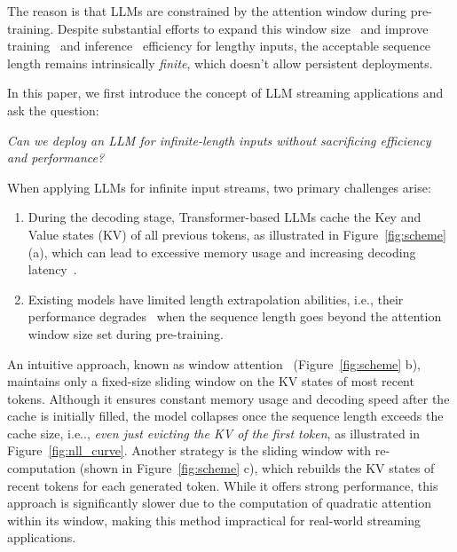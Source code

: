 \documentclass{article} \usepackage{iclr2024_conference,times}
\makeatletter
\DeclareRobustCommand\onedot{\futurelet\@let@token\@onedot}
\def\@onedot{\ifx\@let@token.\else.\null\fi\xspace}
\def\ie{i.e\onedot} \def\Ie{I.e\onedot}
\makeatother
\begin{document}
The reason is that LLMs are constrained by the attention window during pre-training. Despite substantial efforts to expand this window size~\citep{chen2023extending,kaiokendev,peng2023yarn} and improve training~\citep{dao2022flashattention,dao2023flashattention2} and inference~\citep{pope2022efficiently,xiao2023smoothquant,anagnostidis2023dynamic,wang2021spatten,zhang2023h2o} efficiency for lengthy inputs, the acceptable sequence length remains intrinsically \emph{finite}, which doesn't allow persistent deployments.

In this paper, we first introduce the concept of LLM streaming applications and ask the question: 
\begin{center}
   \emph{Can we deploy an LLM for infinite-length inputs without sacrificing efficiency and performance?} 
\end{center}
When applying LLMs for infinite input streams, two primary challenges arise:
\vspace{-0.5em}
\begin{enumerate}
    \item During the decoding stage, Transformer-based LLMs cache the Key and Value states (KV) of all previous tokens, as illustrated in Figure~\ref{fig:scheme} (a), which can lead to excessive memory usage and increasing decoding latency~\citep{pope2022efficiently}.
    \item Existing models have limited length extrapolation abilities, i.e., their performance degrades~\citep{alibi,chen2023extending} when the sequence length goes beyond the attention window size set during pre-training.
\end{enumerate}
\vspace{-0.5em}
An intuitive approach, known as window attention~\citep{beltagy2020longformer} (Figure~\ref{fig:scheme} b), maintains only a fixed-size sliding window on the KV states of most recent tokens. Although it ensures constant memory usage and decoding speed after the cache is initially filled, the model collapses once the sequence length exceeds the cache size, \ie, \emph{even just evicting the KV of the first token}, as illustrated in Figure~\ref{fig:nll_curve}.
Another strategy is the sliding window with re-computation (shown in Figure~\ref{fig:scheme} c), which rebuilds the KV states of recent tokens for each generated token. While it offers strong performance, this approach is significantly slower due to the computation of quadratic attention within its window, making this method impractical for real-world streaming applications.
\end{document}
